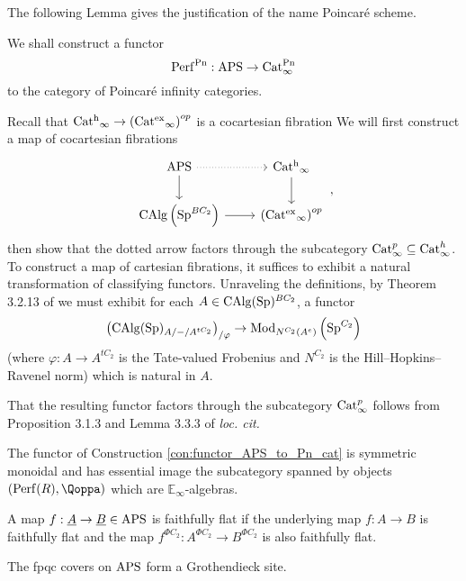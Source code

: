 The following Lemma gives the justification of the name Poincar{\'e} scheme.
\begin{construction}\label{con:functor_APS_to_Pn_cat}
    We shall construct a functor \[\mathrm{Perf}^{\mathrm{Pn}}:\mathrm{APS}\to \mathrm{Cat}_{\infty}^{\mathrm{Pn}}\] to the category of Poincar{\'e} infinity categories. 

    Recall that $ \operatorname{Cat^h}_\infty \to \left( \operatorname{Cat^{ex}}_\infty \right)^{op} $ is a cocartesian fibration \cite[\S1.4.]{CDHHLMNNSI} 
    We will first construct a map of cocartesian fibrations
    \begin{equation}
    \begin{tikzcd}
        \aps \ar[r,dotted] \ar[d] & \Cath_\infty \ar[d] \\
        \CAlg\left(\Sp^{BC_2}\right)\ar[r] & \left( \Catex_\infty \right)^{op}
    \end{tikzcd}\,,
    \end{equation}
    then show that the dotted arrow factors through the subcategory $ \operatorname{Cat}^p_\infty \subseteq \operatorname{Cat}^h_\infty $. 
    To construct a map of cartesian fibrations, it suffices to exhibit a natural transformation of classifying functors. 
    Unraveling the definitions, by Theorem 3.2.13 of \cite{CDHHLMNNSI} we must exhibit for each $ A \in \operatorname{CAlg}(\operatorname{Sp})^{BC_2} $, a functor
    \begin{equation}
        \left(\operatorname{CAlg}(\operatorname{Sp})_{A/-/A^{tC_2}}\right)_{/\varphi} \to \operatorname{Mod}_{N^{C_2}(A^e)}\left(\operatorname{Sp}^{C_2}\right)
    \end{equation}
    (where $ \varphi \colon A \to A^{tC_2} $ is the Tate-valued Frobenius and $ N^{C_2} $ is the Hill--Hopkins--Ravenel norm) which is natural in $ A $. 

    That the resulting functor factors through the subcategory $ \operatorname{Cat}^p_\infty $ follows from Proposition 3.1.3 and Lemma 3.3.3 of \emph{loc. cit.}
\end{construction}
\begin{lemma}
    The functor of Construction \ref{con:functor_APS_to_Pn_cat} is symmetric monoidal and has essential image the subcategory spanned by objects $(\perf(R),\Qoppa)$ which are $\mathbb{E}_\infty$-algebras.
\end{lemma}

\begin{definition}
     A map $f:\underline{A}\to \underline{B}\in \mathrm{APS}$ is faithfully flat if the underlying map $f:A\to B$ is faithfully flat and the map $f^{\Phi C_2}:A^{\Phi C_2}\to B^{\Phi C_2}$ is also faithfully flat.
\end{definition}

\begin{lemma}
    The fpqc covers on $\mathrm{APS}$ form a Grothendieck site. 
\end{lemma}

